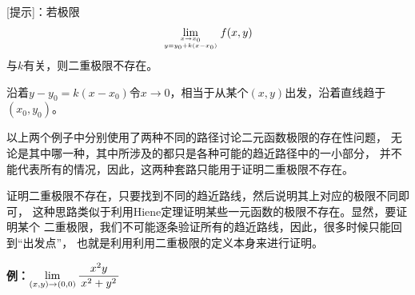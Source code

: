 \begin{center}
	\quad
\end{center}

[提示]：若极限
$$\lim\limits_{{x\to x_0}\atop{y=y_0+k(x-x_0)}}f(x,y)$$
与$k$有关，则二重极限不存在。

沿着$y-y_0=k(x-x_0)$令$x\to0$，相当于从某个$(x,y)$出发，沿着直线趋于$(x_0,y_0)$。

以上两个例子中分别使用了两种不同的路径讨论二元函数极限的存在性问题，
无论是其中哪一种，其中所涉及的都只是各种可能的趋近路径中的一小部分，
并不能代表所有的情况，因此，这两种套路只能用于证明二重极限不存在。

证明二重极限不存在，只要找到不同的趋近路线，然后说明其上对应的极限不同即可，
这种思路类似于利用Hiene定理证明某些一元函数的极限不存在。显然，要证明某个
二重极限，我们不可能逐条验证所有的趋近路线，因此，很多时候只能回到“出发点”，
也就是利用利用二重极限的定义本身来进行证明。

{\bf 例：}$\lim\limits_{(x,y)\to(0,0)}\displaystyle\frac{\,{x^2y}\,}{\,{x^2+y^2}\,}$


